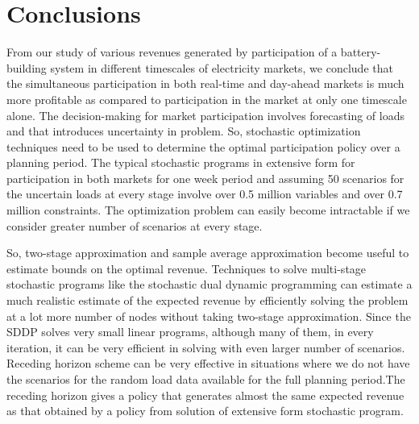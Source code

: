 \documentclass[11pt,twoside]{article}
\begin{document}
\section{Conclusions}
From our study of various revenues generated by participation of a battery-building system in different timescales of electricity markets, we conclude that the simultaneous participation in both real-time and day-ahead markets is much more profitable as compared to participation in the market at only one timescale alone. The decision-making for market participation involves forecasting of loads and that introduces uncertainty in problem. So, stochastic optimization techniques need to be used to determine the optimal participation policy over a planning period. The typical stochastic programs in extensive form for participation in both markets for one week period and assuming 50 scenarios for the uncertain loads at every stage involve over 0.5 million variables and over 0.7 million constraints. The optimization problem can easily become intractable if we consider greater number of scenarios at every stage. 

So, two-stage approximation and sample average approximation become useful to estimate bounds on the optimal revenue. Techniques to solve multi-stage stochastic programs like the stochastic dual dynamic programming can estimate a much realistic estimate of the expected revenue by efficiently solving the problem at a lot more number of nodes without taking two-stage approximation. Since the SDDP solves very small linear programs, although many of them, in every iteration, it can be very efficient in solving with even larger number of scenarios. Receding horizon scheme can be very effective in situations where we do not have the scenarios for the random load data available for the full planning period.The receding horizon gives a policy that generates almost the same expected revenue as that obtained by a policy from solution of extensive form stochastic program.
\end{document}
